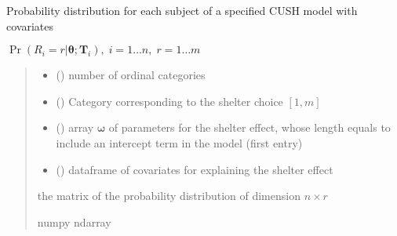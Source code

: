 \documentclass[letterpaper,10pt,english]{sphinxmanual}
\begin{document}

\begin{fulllineitems}
\label{\detokenize{cubmods:cubmods.cush_x.pmfi}}
\pysigstartsignatures
{}
\pysigstopsignatures
\sphinxAtStartPar
Probability distribution for each subject of a specified CUSH model with covariates

\sphinxAtStartPar
\(\Pr(R_i=r|\pmb\theta; \pmb T_i),\; i=1 \ldots n ,\; r=1 \ldots m\)
\begin{quote}\begin{description}
\begin{itemize}
\item {} 
\sphinxAtStartPar
{} () \textendash{} number of ordinal categories

\item {} 
\sphinxAtStartPar
{} () \textendash{} Category corresponding to the shelter choice \([1,m]\)

\item {} 
\sphinxAtStartPar
{} () \textendash{} array \(\pmb \omega\) of parameters for the shelter effect, whose length equals 
 to include an intercept term in the model (first entry)

\item {} 
\sphinxAtStartPar
{} () \textendash{} dataframe of covariates for explaining the shelter effect

\end{itemize}

\sphinxAtStartPar
the matrix of the probability distribution of dimension \(n \times r\)

\sphinxAtStartPar
numpy ndarray

\end{description}\end{quote}

\end{fulllineitems}
\end{document}
